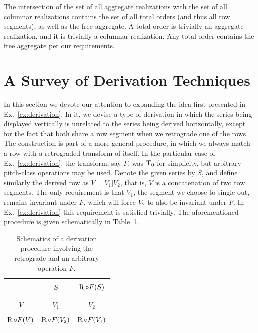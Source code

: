 \begin{example}
    \cite[201, 210]{Starr1984}
    The intersection of the set of all aggregate realizations with the set of all columnar realizations contains the set of all total orders (and thus all row segments), as well as the free aggregate. A total order is trivially an aggregate realization, and it is trivially a columnar realization. Any total order contains the free aggregate per our requirements.
\end{example}

\section{A Survey of Derivation Techniques}

In this section we devote our attention to expanding the idea first presented in Ex.~\ref{ex:derivation}. In it, we devise a type of derivation in which the series being displayed vertically is unrelated to the series being derived horizontally, except for the fact that both share a row segment when we retrograde one of the rows. The construction is part of a more general procedure, in which we always match a row with a retrograded transform of itself. In the particular case of Ex.~\ref{ex:derivation}, the transform, say $F$, was $\operatorname{T}_0$ for simplicity, but arbitrary pitch-class operations may be used. Denote the given series by $S$, and define similarly the derived row as $V = V_1 | V_2$, that is, $V$ is a concatenation of two row segments. The only requirement is that $V_1$, the segment we choose to single out, remains invariant under $F$, which will force $V_2$ to also be invariant under $F$. In Ex.~\ref{ex:derivation} this requirement is satisfied trivially. The aforementioned procedure is given schematically in Table~\ref{derivation-retrograde}.

\begin{table}[htbp]
    \caption[Derivation Involving the Retrograde and an Arbitrary Operation]{Schematics of a derivation procedure involving the retrograde and an arbitrary operation $F$.}
    \label{derivation-retrograde}
    \centering
    \vspace{12pt}
    \begin{tabular}{c|cc}
        \hline\\
        & $S$ & $\operatorname{R} \circ F(S)$\\\\
        \hline\\
        $V$ & $V_1$ & $V_2$ \\\\
        $\operatorname{R} \circ F(V)$ & $\operatorname{R} \circ F(V_2)$ & $\operatorname{R} \circ F(V_1)$ \\\\
        \hline
    \end{tabular}
\end{table}

